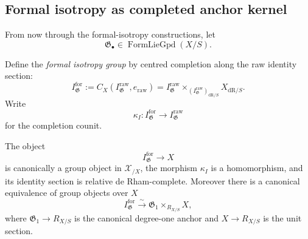 \subsection{Formal isotropy as completed anchor kernel}

From now through the formal-isotropy constructions, let
\[
    \mathfrak G_\bullet\in\operatorname{FormLieGpd}(X/S).
\]

\begin{definition}
\label{def:isotropy-formal-group}
Define the \emph{formal isotropy group} by centred completion along the raw
identity section:
\[
    I^{\mathrm{for}}_{\mathfrak G}
    :=
    C_X
    \left(
        I^{\mathrm{raw}}_{\mathfrak G},
        e_{\mathrm{raw}}
    \right)
    =
    I^{\mathrm{raw}}_{\mathfrak G}
    \times_{
        (I^{\mathrm{raw}}_{\mathfrak G})_{\mathrm{dR}/S}
    }
    X_{\mathrm{dR}/S}.
\]
Write
\[
    \kappa_I:
    I^{\mathrm{for}}_{\mathfrak G}
    \longrightarrow
    I^{\mathrm{raw}}_{\mathfrak G}
\]
for the completion counit.
\end{definition}

\begin{theorem}
\label{thm:isotropy-group}
The object
\[
    I^{\mathrm{for}}_{\mathfrak G}\to X
\]
is canonically a group object in $\mathcal X_{/X}$, the morphism
$\kappa_I$ is a homomorphism, and its identity section is relative
de Rham-complete.  Moreover there is a canonical equivalence of group objects
over $X$
\[
    I^{\mathrm{for}}_{\mathfrak G}
    \xrightarrow{\sim}
    \mathfrak G_1
    \times_{R_{X/S}}
    X,
\]
where $\mathfrak G_1\to R_{X/S}$ is the canonical degree-one anchor and
$X\to R_{X/S}$ is the unit section.
\end{theorem}

